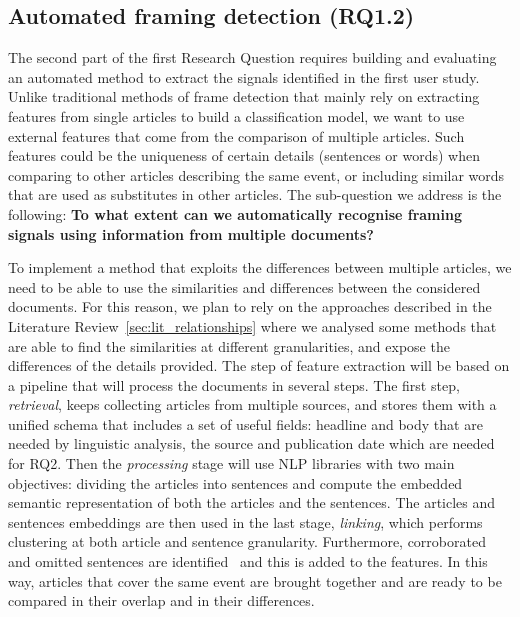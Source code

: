 \subsection{Automated framing detection (RQ1.2)}

The second part of the first Research Question requires building and evaluating an automated method to extract the signals identified in the first user study.
Unlike traditional methods of frame detection that mainly rely on extracting features from single articles to build a classification model, we want to use external features that come from the comparison of multiple articles. Such features could be the uniqueness of certain details (sentences or words) when comparing to other articles describing the same event, or including similar words that are used as substitutes in other articles.
The sub-question we address is the following:
\textbf{To what extent can we automatically recognise framing signals using information from multiple documents?}

To implement a method that exploits the differences between multiple articles, we need to be able to use the similarities and differences between the considered documents.
For this reason, we plan to rely on the approaches described in the Literature Review~\ref{sec:lit_relationships} where we analysed some methods that are able to find the similarities at different granularities, and expose the differences of the details provided.
The step of feature extraction will be based on a pipeline that will process the documents in several steps.
The first step, \emph{retrieval}, keeps collecting articles from multiple sources, and stores them with a unified schema that includes a set of useful fields: headline and body that are needed by linguistic analysis, the source and publication date which are needed for RQ2.
Then the \emph{processing} stage will use NLP libraries with two main objectives: dividing the articles into sentences and compute the embedded semantic representation of both the articles and the sentences.
The articles and sentences embeddings are then used in the last stage, \emph{linking}, which performs clustering at both article and sentence granularity. Furthermore, corroborated and omitted sentences are identified~\cite{bountouridis2018explaining} and this is added to the features.
In this way, articles that cover the same event are brought together and are ready to be compared in their overlap and in their differences.


